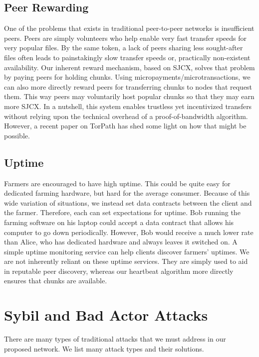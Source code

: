 \documentclass[a4paper,10pt]{article}
\begin{document}
\subsection{Peer Rewarding}
One of the problems that exists in traditional peer-to-peer networks is insufficient peers. Peers are simply volunteers who help enable very fast transfer speeds for very popular files. By the same token, a lack of peers sharing less sought-after files often leads to painstakingly slow transfer speeds or, practically non-existent availability. Our inherent reward mechanism, based on SJCX, solves that problem by paying peers for holding chunks. Using micropayments/microtransactions, we can also more directly reward peers for transferring chunks to nodes that request them. This way peers may voluntarily host popular chunks so that they may earn more SJCX. In a nutshell, this system enables trustless yet incentivized transfers without relying upon the technical overhead of a proof-of-bandwidth algorithm. However, a recent paper on TorPath \cite{14} has shed some light on how that might be possible.  

\subsection{Uptime}
Farmers are encouraged to have high uptime. This could be quite easy for dedicated farming hardware, but hard for the average consumer. Because of this wide variation of situations, we instead set data contracts between the client and the farmer. Therefore, each can set expectations for uptime. Bob running the farming software on his laptop could accept a data contract that allows his computer to go down periodically. However, Bob would receive a much lower rate than Alice, who has dedicated hardware and always leaves it switched on. A simple uptime monitoring service can help clients discover farmers’ uptimes. We are not inherently reliant on these uptime services. They are simply used to aid in reputable peer discovery, whereas our heartbeat algorithm more directly ensures that chunks are available.

\section{Sybil and Bad Actor Attacks}
There are many types of traditional attacks that we must address in our proposed network. We list many attack types and their solutions. 
\end{document}
